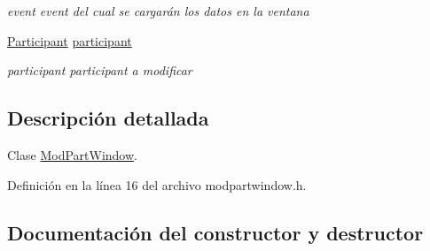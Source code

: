 \begin{DoxyCompactItemize}
\begin{DoxyCompactList}\small\item\em event event del cual se cargarán los datos en la ventana \end{DoxyCompactList}\item 
\hyperlink{class_participant}{Participant} \hyperlink{class_mod_part_window_a4a70ae7bf17facd76bbcbae73cf71c9e}{participant}\hypertarget{class_mod_part_window_a4a70ae7bf17facd76bbcbae73cf71c9e}{}\label{class_mod_part_window_a4a70ae7bf17facd76bbcbae73cf71c9e}

\begin{DoxyCompactList}\small\item\em participant participant a modificar \end{DoxyCompactList}\end{DoxyCompactItemize}


\subsection{Descripción detallada}
Clase \hyperlink{class_mod_part_window}{Mod\+Part\+Window}. 

Definición en la línea 16 del archivo modpartwindow.\+h.



\subsection{Documentación del constructor y destructor}
